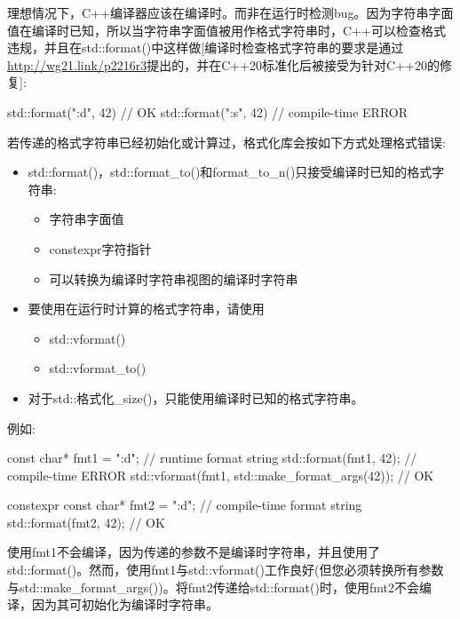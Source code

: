 理想情况下，C++编译器应该在编译时。而非在运行时检测bug。因为字符串字面值在编译时已知，所以当字符串字面值被用作格式字符串时，C++可以检查格式违规，并且在std::format()中这样做[编译时检查格式字符串的要求是通过\url{http://wg21.link/p2216r3}提出的，并在C++20标准化后被接受为针对C++20的修复]:

\begin{cpp}
std::format("{:d}", 42) // OK
std::format("{:s}", 42) // compile-time ERROR
\end{cpp}

若传递的格式字符串已经初始化或计算过，格式化库会按如下方式处理格式错误:

\begin{itemize}
\item
std::format()，std::format\_to()和format\_to\_n()只接受编译时已知的格式字符串:

\begin{itemize}
\item
字符串字面值

\item
constexpr字符指针

\item
可以转换为编译时字符串视图的编译时字符串
\end{itemize}

\item
要使用在运行时计算的格式字符串，请使用

\begin{itemize}
\item
std::vformat()

\item
std::vformat\_to()
\end{itemize}

\item
对于std::格式化\_size()，只能使用编译时已知的格式字符串。
\end{itemize}

例如:

\begin{cpp}
const char* fmt1 = "{:d}"; // runtime format string
std::format(fmt1, 42); // compile-time ERROR
std::vformat(fmt1, std::make_format_args(42)); // OK

constexpr const char* fmt2 = "{:d}"; // compile-time format string
std::format(fmt2, 42); // OK
\end{cpp}

使用fmt1不会编译，因为传递的参数不是编译时字符串，并且使用了std::format()。然而，使用fmt1与std::vformat()工作良好(但您必须转换所有参数与std::make\_format\_args())。将fmt2传递给std::format()时，使用fmt2不会编译，因为其可初始化为编译时字符串。

